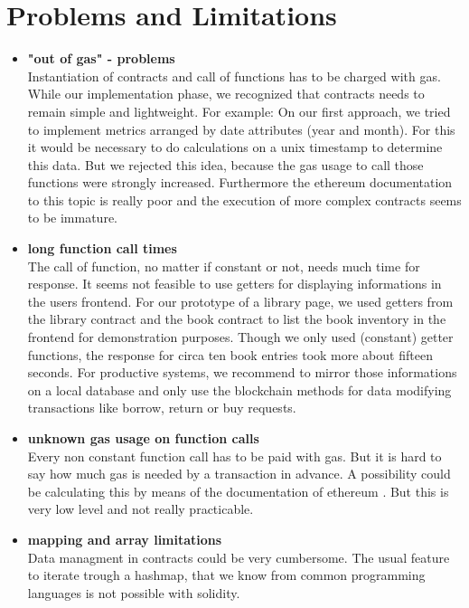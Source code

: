 \section{Problems and Limitations}
\begin{itemize}
\item \textbf{"out of gas" - problems}\\
Instantiation of contracts and call of functions has to be charged with gas. While our implementation phase, we recognized that contracts needs to remain simple and lightweight. 
For example: On our first approach, we tried to implement metrics arranged by date attributes (year and month). For this it would be necessary to do calculations on a unix timestamp to determine this data.
But we rejected this idea, because the gas usage to call those functions were strongly increased. Furthermore the ethereum documentation to this topic is really poor and the execution of more complex contracts seems to be immature.

\item \textbf{long function call times}\\
The call of function, no matter if constant or not, needs much time for response. It seems not feasible to use getters for displaying informations in the users frontend.
For our prototype of a library page, we used getters from the library contract and the book contract to list the book inventory in the frontend for demonstration purposes. Though we only used (constant) getter functions, the response for circa ten book entries took more about fifteen seconds. For productive systems, we recommend to mirror those informations on a local database and only use the blockchain methods for data modifying transactions like borrow, return or buy requests.

\item \textbf{unknown gas usage on function calls}\\
Every non constant function call has to be paid with gas. But it is hard to say how much gas is needed by a transaction in advance. A possibility could be calculating this by means of the documentation of ethereum \cite{wood2014ethereum}. But this is very low level and not really practicable. 

\item \textbf{mapping and array limitations}\\
Data managment in contracts could be very cumbersome. The usual feature to iterate trough a hashmap, that we know from common programming languages is not possible with solidity.


\end{itemize}
